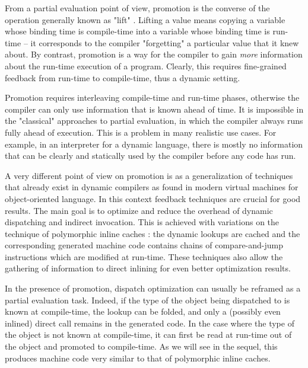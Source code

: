 From a partial evaluation point of view, promotion is the converse of
the operation generally known as "lift" \cite{XXX}.  Lifting a value means
copying a variable whose binding time is compile-time into a variable
whose binding time is run-time – it corresponds to the compiler
"forgetting" a particular value that it knew about.  By contrast,
promotion is a way for the compiler to gain \emph{more} information about
the run-time execution of a program. Clearly, this requires
fine-grained feedback from run-time to compile-time, thus a
dynamic setting.

Promotion requires interleaving compile-time and run-time phases,
otherwise the compiler can only use information that is known ahead of
time. It is impossible in the "classical" approaches to partial
evaluation, in which the compiler always runs fully ahead of execution.
This is a problem in many realistic use cases.  For example, in an
interpreter for a dynamic language, there is mostly no information
that can be clearly and statically used by the compiler before any
code has run.

A very different point of view on promotion is as a generalization of techniques
that already exist in dynamic compilers as found in modern virtual machines for
object-oriented language.  In this context feedback
techniques are crucial for good results.  The main goal is to
optimize and reduce the overhead of dynamic dispatching and indirect
invocation.  This is achieved with variations on the technique of
polymorphic inline caches \cite{hoelzle_optimizing_1991}: the dynamic lookups are cached and
the corresponding generated machine code contains chains of
compare-and-jump instructions which are modified at run-time.  These
techniques also allow the gathering of information to direct inlining for even
better optimization results. 

In the presence of promotion, dispatch optimization can usually be
reframed as a partial evaluation task.  Indeed, if the type of the
object being dispatched to is known at compile-time, the lookup can be
folded, and only a (possibly even inlined) direct call remains in the
generated code.  In the case where the type of the object is not known
at compile-time, it can first be read at run-time out of the object and
promoted to compile-time.  As we will see in the sequel, this produces
machine code very similar to that of polymorphic inline
caches.

